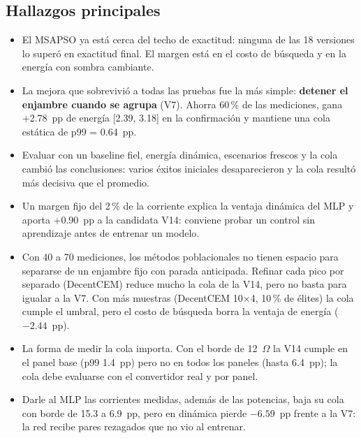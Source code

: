 \documentclass[letterpaper,11pt]{article}
\begin{document}
\subsection{Hallazgos principales}
\begin{itemize}[leftmargin=1.5em, itemsep=2pt]
  \item El MSAPSO ya está cerca del techo de exactitud: ninguna de las 18 versiones lo superó en exactitud final. El margen está en el costo de búsqueda y en la energía con sombra cambiante.
  \item La mejora que sobrevivió a todas las pruebas fue la más simple: \textbf{detener el enjambre cuando se agrupa} (V7). Ahorra 60\,\% de las mediciones, gana +2.78~pp de energía [2.39, 3.18] en la confirmación y mantiene una cola estática de p99 = 0.64~pp.
  \item Evaluar con un baseline fiel, energía dinámica, escenarios frescos y la cola cambió las conclusiones: varios éxitos iniciales desaparecieron y la cola resultó más decisiva que el promedio.
  \item Un margen fijo del 2\,\% de la corriente explica la ventaja dinámica del MLP y aporta +0.90~pp a la candidata V14: conviene probar un control sin aprendizaje antes de entrenar un modelo.
  \item Con 40 a 70 mediciones, los métodos poblacionales no tienen espacio para separarse de un enjambre fijo con parada anticipada. Refinar cada pico por separado (DecentCEM) reduce mucho la cola de la V14, pero no basta para igualar a la V7. Con más muestras (DecentCEM 10$\times$4, 10\,\% de élites) la cola cumple el umbral, pero el costo de búsqueda borra la ventaja de energía ($-2.44$~pp).
  \item La forma de medir la cola importa. Con el borde de 12~$\Omega$ la V14 cumple en el panel base (p99 1.4~pp) pero no en todos los paneles (hasta 6.4~pp); la cola debe evaluarse con el convertidor real y por panel.
  \item Darle al MLP las corrientes medidas, además de las potencias, baja su cola con borde de 15.3 a 6.9~pp, pero en dinámica pierde $-6.59$~pp frente a la V7: la red recibe pares rezagados que no vio al entrenar.
\end{itemize}
\end{document}
